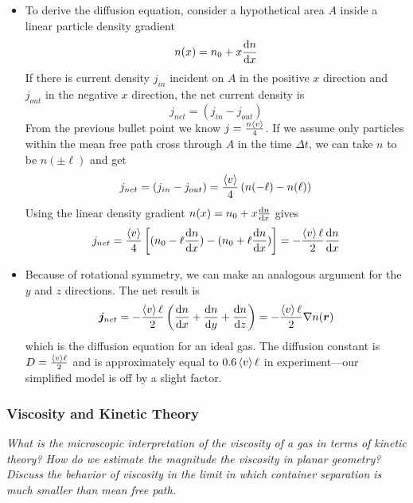 \documentclass[11pt, a4paper]{article}
\begin{document}
\begin{itemize}
	\item To derive the diffusion equation, consider a hypothetical area $ A $ inside a linear particle density gradient
	\begin{equation*}
		n(x) = n_{0} + x \dv{n}{x}
	\end{equation*}
	If there is current density $ j_{in} $ incident on $ A $ in the positive $ x $ direction and $ j_{out} $ in the negative $ x $ direction, the net current density is
	\begin{equation*}
		j_{net} = (j_{in} - j_{out}) 
	\end{equation*}
	From the previous bullet point we know $ j = \frac{n\expval{v}}{4} $. If we assume only particles within the mean free path cross through $ A $ in the time $ \Delta t $, we can take $ n $ to be $ n(\pm \ell) $ and get
	\begin{equation*}
		j_{net} = (j_{in} - j_{out}) = \frac{\expval{v}}{4}\left(n(-\ell) - n(\ell)\right)
	\end{equation*}
	Using the linear density gradient $ n(x) = n_{0} + x \dv{n}{x} $ gives
	\begin{equation*}
		j_{net} = \frac{\expval{v}}{4}\left[(n_{0} -\ell \dv{n}{x}) - (n_{0} + \ell \dv{n}{x})\right] = -\frac{\expval{v}\ell}{2} \dv{n}{x}
	\end{equation*}
	
	\item Because of rotational symmetry, we can make an analogous argument for the $ y $ and $ z $ directions. The net result is
	\begin{equation*}
		\bm{j}_{net} = -\frac{\expval{v}\ell}{2} \left(\dv{n}{x} + \dv{n}{y} + \dv{n}{z} \right) = - \frac{\expval{v}\ell}{2} \nabla n(\bm{r})
	\end{equation*}
	which is the diffusion equation for an ideal gas. The diffusion constant is $ D = \frac{\expval{v}\ell}{2} $ and is approximately equal to $ 0.6 \expval{v} \ell $ in experiment---our simplified model is off by a slight factor.
\end{itemize}


\subsubsection{Viscosity and Kinetic Theory}
\textit{What is the microscopic interpretation of the viscosity of a gas in terms of kinetic theory? How do we estimate the magnitude the viscosity in planar geometry? Discuss the behavior of viscosity in the limit in which container separation is much smaller than mean free path.}
\end{document}
